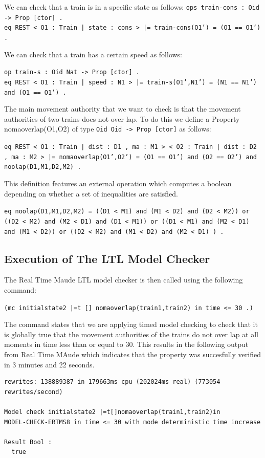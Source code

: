 We can check that a train is in a specific state as follows:
\texttt{ops train-cons : Oid -> Prop [ctor] .} \\ \medskip
\texttt{eq {REST < O1 : Train | state : cons >} |= train-cons(O1') = (O1 == O1') . } \\
\bigskip

We can check that a train has a certain speed as follows:

\texttt{op train-s : Oid Nat -> Prop [ctor] .} \\ \medskip
\texttt{eq {REST < O1 : Train | speed : N1 >} |= train-s(O1',N1') = (N1 == N1') and (O1 == O1') .}

The main movement authority that we want to check is that the movement authorities of two trains does not over lap.
To do this we define a Property nomaoverlap(O1,O2) of type \texttt{Oid Oid -> Prop [ctor]} as follows: 

\begin{center}
\texttt{eq {REST < O1 : Train |  dist : D1 , ma : M1 > < O2 : Train |  dist : D2 , ma : M2 >} |= nomaoverlap(O1',O2') = (O1 == O1') and (O2 == O2') and noolap(D1,M1,D2,M2) .} 
\end{center}

This definition features an external operation which computes a boolean depending on whether a set of inequalities are satisfied. 

\begin{center}
\texttt{eq noolap(D1,M1,D2,M2) = ((D1 < M1) and (M1 < D2) and (D2 < M2)) or ((D2 < M2) and (M2 < D1) and (D1 < M1)) or ((D1 < M1) and (M2 < D1) and (M1 < D2)) or ((D2 < M2) and (M1 < D2) and (M2 < D1) )  .}    
\end{center}

\subsection{Execution of The LTL Model Checker}

The Real Time Maude LTL model checker is then called using the following command:

\begin{center}
\texttt{(mc initialstate2 |=t [] nomaoverlap(train1,train2) in time <= 30 .)}
\end{center}
The command states that we are applying timed model checking to check that it is globally true that the movement authorities of the trains do not over lap at all moments in time less than or equal to 30. This results in the following output from Real Time MAude which indicates that the property was succesfully verified in 3 minutes and 22 seconds.
\begin{verbatim}
rewrites: 138889387 in 179663ms cpu (202024ms real) (773054 rewrites/second)

Model check initialstate2 |=t[]nomaoverlap(train1,train2)in 
MODEL-CHECK-ERTMS8 in time <= 30 with mode deterministic time increase

Result Bool :
  true
\end{verbatim}

